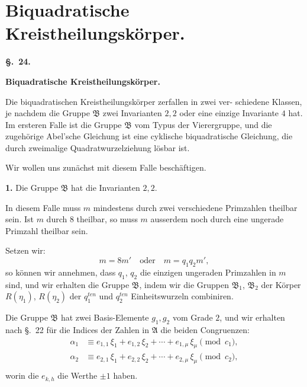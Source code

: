 \documentclass[12pt,a4paper]{article}
\begin{document}
\newpage
\section{Biquadratische Kreistheilungsk\"orper.}
\label{sec:24}

\begin{center}\textbf{\S.~24.}\end{center}
\begin{center}\large\bfseries Biquadratische Kreistheilungsk\"orper.\end{center}

Die biquadratischen Kreistheilungsk\"orper zerfallen in zwei ver-
schiedene Klassen, je nachdem die Gruppe $\mathfrak{B}$ zwei Invarianten
$2, 2$ oder eine einzige Invariante $4$ hat. Im ersteren Falle ist
die Gruppe $\mathfrak{B}$ vom Typus der Vierergruppe, und die zugeh\"orige
Abel'sche Gleichung ist eine cyklische biquadratische Gleichung,
die durch zweimalige Quadratwurzelziehung l\"osbar ist.

Wir wollen uns zun\"achst mit diesem Falle besch\"aftigen.

\medskip
\noindent\textbf{1.} Die Gruppe $\mathfrak{B}$ hat die Invarianten $2, 2$.

In diesem Falle muss $m$ mindestens durch zwei verschiedene
Primzahlen theilbar sein. Ist $m$ durch $8$ theilbar, so muss
$m$ ausserdem noch durch eine ungerade Primzahl theilbar sein.

Setzen wir:
\[m = 8m'\quad \text{oder}\quad m = q_1 q_2 m',\]
so k\"onnen wir annehmen, dass $q_1$, $q_2$ die einzigen ungeraden
Primzahlen in $m$ sind, und wir erhalten die Gruppe $\mathfrak{B}$, indem
wir die Gruppen $\mathfrak{B}_1$, $\mathfrak{B}_2$ der K\"orper $R(\eta_1)$, $R(\eta_2)$ der $q_1^{ten}$
und $q_2^{ten}$ Einheitswurzeln combiniren.

Die Gruppe $\mathfrak{B}$ hat zwei Basis-Elemente $g_1, g_2$ vom Grade $2$,
und wir erhalten nach \S.~22 f\"ur die Indices der Zahlen in $\mathfrak{A}$ die beiden
Congruenzen:
\begin{equation}\label{eq:k24-1}
\begin{aligned}
\alpha_1 &\equiv e_{1,1}\,\xi_1 + e_{1,2}\,\xi_2 + \cdots + e_{1,\mu}\,\xi_\mu \pmod{c_1},\\
\alpha_2 &\equiv e_{2,1}\,\xi_1 + e_{2,2}\,\xi_2 + \cdots + e_{2,\mu}\,\xi_\mu \pmod{c_2},\\
\end{aligned}
\end{equation}
worin die $e_{k,h}$ die Werthe $\pm 1$ haben.
\end{document}
